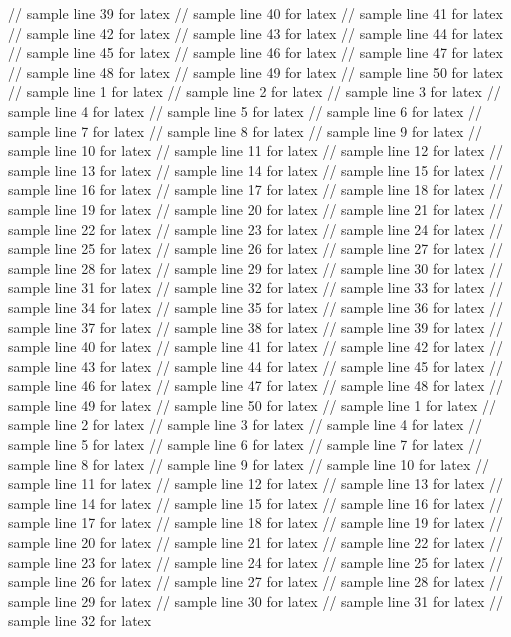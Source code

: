 // sample line 39 for latex
// sample line 40 for latex
// sample line 41 for latex
// sample line 42 for latex
// sample line 43 for latex
// sample line 44 for latex
// sample line 45 for latex
// sample line 46 for latex
// sample line 47 for latex
// sample line 48 for latex
// sample line 49 for latex
// sample line 50 for latex
// sample line 1 for latex
// sample line 2 for latex
// sample line 3 for latex
// sample line 4 for latex
// sample line 5 for latex
// sample line 6 for latex
// sample line 7 for latex
// sample line 8 for latex
// sample line 9 for latex
// sample line 10 for latex
// sample line 11 for latex
// sample line 12 for latex
// sample line 13 for latex
// sample line 14 for latex
// sample line 15 for latex
// sample line 16 for latex
// sample line 17 for latex
// sample line 18 for latex
// sample line 19 for latex
// sample line 20 for latex
// sample line 21 for latex
// sample line 22 for latex
// sample line 23 for latex
// sample line 24 for latex
// sample line 25 for latex
// sample line 26 for latex
// sample line 27 for latex
// sample line 28 for latex
// sample line 29 for latex
// sample line 30 for latex
// sample line 31 for latex
// sample line 32 for latex
// sample line 33 for latex
// sample line 34 for latex
// sample line 35 for latex
// sample line 36 for latex
// sample line 37 for latex
// sample line 38 for latex
// sample line 39 for latex
// sample line 40 for latex
// sample line 41 for latex
// sample line 42 for latex
// sample line 43 for latex
// sample line 44 for latex
// sample line 45 for latex
// sample line 46 for latex
// sample line 47 for latex
// sample line 48 for latex
// sample line 49 for latex
// sample line 50 for latex
// sample line 1 for latex
// sample line 2 for latex
// sample line 3 for latex
// sample line 4 for latex
// sample line 5 for latex
// sample line 6 for latex
// sample line 7 for latex
// sample line 8 for latex
// sample line 9 for latex
// sample line 10 for latex
// sample line 11 for latex
// sample line 12 for latex
// sample line 13 for latex
// sample line 14 for latex
// sample line 15 for latex
// sample line 16 for latex
// sample line 17 for latex
// sample line 18 for latex
// sample line 19 for latex
// sample line 20 for latex
// sample line 21 for latex
// sample line 22 for latex
// sample line 23 for latex
// sample line 24 for latex
// sample line 25 for latex
// sample line 26 for latex
// sample line 27 for latex
// sample line 28 for latex
// sample line 29 for latex
// sample line 30 for latex
// sample line 31 for latex
// sample line 32 for latex
